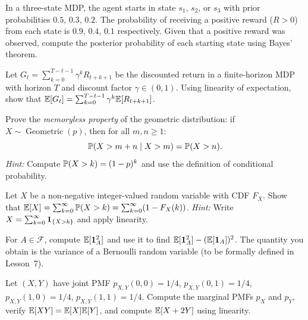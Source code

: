 \documentclass[11pt,a4paper]{article}
\begin{document}
\begin{exercise}
\label{ex:bayes_three}
In a three-state MDP, the agent starts in state $s_1$, $s_2$, or $s_3$
with prior probabilities $0.5$, $0.3$, $0.2$. The probability of
receiving a positive reward ($R > 0$) from each state is $0.9$, $0.4$,
$0.1$ respectively. Given that a positive reward was observed, compute
the posterior probability of each starting state using Bayes' theorem.
\end{exercise}

\begin{exercise}
\label{ex:linearity_return}
Let $G_t = \sum_{k=0}^{T-t-1} \gamma^k R_{t+k+1}$ be the discounted
return in a finite-horizon MDP with horizon $T$ and discount factor
$\gamma \in (0,1)$. Using linearity of expectation, show that
$\mathbb{E}[G_t] = \sum_{k=0}^{T-t-1} \gamma^k \mathbb{E}[R_{t+k+1}]$.
\end{exercise}

\begin{exercise}
\label{ex:geometric_memoryless}
Prove the \emph{memoryless property} of the geometric distribution: if
$X \sim \operatorname{Geometric}(p)$, then for all $m, n \geq 1$:
\[
  \mathbb{P}(X > m + n \mid X > m) = \mathbb{P}(X > n).
\]
\textit{Hint:} Compute $\mathbb{P}(X > k) = (1-p)^k$ and use the definition of
conditional probability.
\end{exercise}

\begin{exercise}
\label{ex:cdf_determines_expectation}
Let $X$ be a non-negative integer-valued random variable with CDF $F_X$.
Show that $\mathbb{E}[X] = \sum_{k=0}^\infty \mathbb{P}(X > k)
= \sum_{k=0}^\infty (1 - F_X(k))$.
\textit{Hint:} Write $X = \sum_{k=0}^\infty \mathbf{1}_{\{X > k\}}$ and
apply linearity.
\end{exercise}

\begin{exercise}
\label{ex:indicator_variance_preview}
For $A \in \mathcal{F}$, compute $\mathbb{E}[\mathbf{1}_A^2]$ and use it to find
$\mathbb{E}[\mathbf{1}_A^2] - (\mathbb{E}[\mathbf{1}_A])^2$. The quantity you obtain is
the variance of a Bernoulli random variable (to be formally defined in
Lesson~7).
\end{exercise}

\begin{exercise}
\label{ex:joint_marginal_compute}
Let $(X, Y)$ have joint PMF $p_{X,Y}(0,0) = 1/4$, $p_{X,Y}(0,1) = 1/4$,
$p_{X,Y}(1,0) = 1/4$, $p_{X,Y}(1,1) = 1/4$.
Compute the marginal PMFs $p_X$ and $p_Y$, verify $\mathbb{E}[XY] = \mathbb{E}[X]\mathbb{E}[Y]$,
and compute $\mathbb{E}[X + 2Y]$ using linearity.
\end{exercise}
\end{document}
